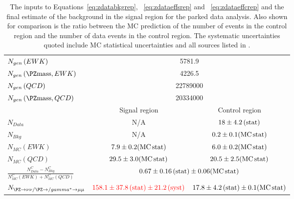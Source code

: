 \begin{table}
  \caption{The inputs to Equations~\ref{eq:zdatabkgrep}, ~\ref{eq:zdataeffsrep} and ~\ref{eq:zdataeffcrep} and the final estimate of the \Znunu background in the signal region for the parked data analysis. Also shown for comparison is the ratio between the MC prediction of the number of \Zmumu events in the control region and the number of data events in the control region. The systematic uncertainties quoted include MC statistical uncertainties and all sources listed in . }
  \label{tab:parkedznunu}
  \begin{tabular}{lcc}
    \hline
    \hline
    $N_{gen}\left(\mathnormal{EWK}\right)$&\multicolumn{2}{c}{5781.9}\\
    $N_{gen}\left(\PZ\rm{mass},\mathnormal{EWK}\right)$&\multicolumn{2}{c}{4226.5}\\
    $N_{gen}\left(\mathnormal{QCD}\right)$&\multicolumn{2}{c}{22789000}\\
    $N_{gen}\left(\PZ\rm{mass},\mathnormal{QCD}\right)$&\multicolumn{2}{c}{20334000}\\
    \hline
    \hline
    & Signal region & Control region \\
    \hline
    \hline
    $N_{Data}$ & N/A & $18\pm 4.2\,\text{(stat)}$ \\
    $N_{Bkg}$ & N/A & $0.2\pm 0.1 (\rm{MC\,stat})$ \\
    $N_{MC}\left(EWK\right)$ & $7.9\pm 0.2 (\rm{MC\,stat})$& $6.0\pm 0.2 (\rm{MC\,stat})$ \\
    $N_{MC}\left(QCD\right)$ & $29.5\pm 3.0 (\rm{MC\,stat})$ & $20.5\pm 2.5 (\rm{MC\,stat})$ \\
    \hline
    $\frac{N^{C}_{Data}-N^{C}_{Bkg}}{N^{C}_{MC}\left(EWK\right)+N^{C}_{MC}\left(QCD\right)}$ & \multicolumn{2}{c}{$0.67\pm 0.16\,\text{(stat)}\pm 0.06 (\rm{MC\,stat})$} \\
    \hline
    $N_{\PZ\rightarrow \nu\nu/\PZ\rightarrow/\gamma^{*}\rightarrow\mu\mu}$ & $\textcolor{red}{158.1\pm 37.8\,\text{(stat)}\pm 21.2\,\text{(syst)}}$ & $17.8\pm 4.2\,\text{(stat)}\pm 0.1 (\rm{MC\,stat})$ \\
    \hline
    \hline
  \end{tabular}
\end{table}

